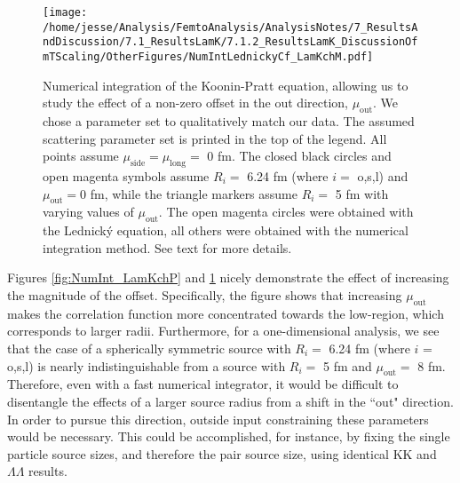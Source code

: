\documentclass[/home/jesse/Analysis/FemtoAnalysis/AnalysisNotes/AnalysisNoteJBuxton.tex]{subfiles}
\begin{document}
\begin{figure}[h!]
  \centering
  \texttt{[image: /home/jesse/Analysis/FemtoAnalysis/AnalysisNotes/7\_ResultsAndDiscussion/7.1\_ResultsLamK/7.1.2\_ResultsLamK\_DiscussionOfmTScaling/OtherFigures/NumIntLednickyCf\_LamKchM.pdf]}
  \caption[Numerical integration of Koonin-Pratt equation: \LamKchM]
  {
  Numerical integration of the Koonin-Pratt equation, allowing us to study the effect of a non-zero offset in the out direction, $\mu_{\mathrm{out}}$.
  We chose a parameter set to qualitatively match our \LamKchM data.
  The assumed scattering parameter set is printed in the top of the legend.
  All points assume $\mu_{\mathrm{side}} = \mu_{\mathrm{long}} =$ 0 fm.
  The closed black circles and open magenta symbols assume $R_{i} =$ 6.24 fm (where $i =$ o,s,l) and $\mu_{\mathrm{out}} = 0$ fm, while the triangle markers assume $R_{i} =$ 5 fm with varying values of $\mu_{\mathrm{out}}$.
  The open magenta circles were obtained with the Lednick\'y equation, all others were obtained with the numerical integration method.
  See text for more details.
  }
  \label{fig:NumInt_LamKchM}
\end{figure}


Figures \ref{fig:NumInt_LamKchP} and \ref{fig:NumInt_LamKchM} nicely demonstrate the effect of increasing the magnitude of the offset.
Specifically, the figure shows that increasing $\mu_{\mathrm{out}}$ makes the correlation function more concentrated towards the low-\kstar region, which corresponds to larger radii.
Furthermore, for a one-dimensional analysis, we see that the case of a spherically symmetric source with $R_{i}=$ 6.24 fm (where $i$ = o,s,l) is nearly indistinguishable from a source with $R_{i}=$ 5 fm and $\mu_{\mathrm{out}} =$ 8 fm.
Therefore, even with a fast numerical integrator, it would be difficult to disentangle the effects of a larger source radius from a shift in the ``out" direction.
In order to pursue this direction, outside input constraining these parameters would be necessary.
This could be accomplished, for instance,  by fixing the single particle source sizes, and therefore the pair source size, using identical KK and $\Lambda\Lambda$ results.
\end{document}
